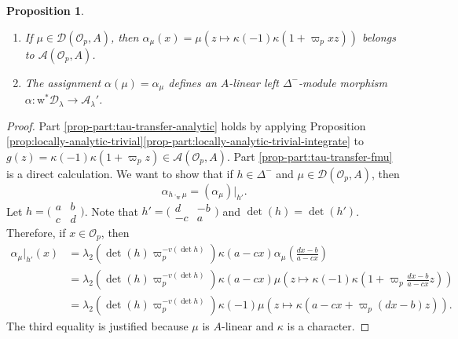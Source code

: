 \documentclass[10pt, twoside]{amsart}
\theoremstyle{plain}
\newtheorem{proposition}[theorem]{Proposition}
\theoremstyle{definition}
\theoremstyle{remark}
\numberwithin{equation}{subsection}
\def\scro{\mathscr O}
\def\scra{\mathscr A}
\def\scrd{\mathscr D}
\def\scro{\mathscr O}
\newcommand{\smallmat}[4]{\bigl(\begin{smallmatrix}#1&#2\\#3&#4\end{smallmatrix}\bigr)}
\begin{document}
\begin{proposition}\label{prop:tau-transfer}
\leavevmode
\begin{enumerate}[label=(\roman*)]
\item If $\mu \in \scrd(\scro_p,A)$, then $
\alpha_\mu(x) = \mu(z \mapsto \kappa(-1)\kappa(1 + \varpi_p xz))$ belongs to $\scra(\scro_p,A)$.\label{prop-part:tau-transfer-analytic}
\item The assignment $\alpha(\mu) = \alpha_\mu$ defines an $A$-linear left $\Delta^-$-module morphism $\alpha: { \boldsymbol{\mathrm{w}}}^{\ast}\scrd_\lambda \rightarrow \scra_\lambda'$.\label{prop-part:tau-transfer-fmu}
\end{enumerate}
\end{proposition}
\begin{proof}
Part \ref{prop-part:tau-transfer-analytic} holds by applying Proposition \ref{prop:locally-analytic-trivial}\ref{prop-part:locally-analytic-trivial-integrate} to $g(z) = \kappa(-1)\kappa(1+\varpi_pz) \in \scra(\scro_p,A)$. Part \ref{prop-part:tau-transfer-fmu} is a direct calculation. We want to show that if $h \in \Delta^-$ and $\mu \in \scrd(\scro_p,A)$, then 
\begin{equation}\label{eqn:tau-transfer-goal}
\alpha_{h\cdot_{ \boldsymbol{\mathrm{w}}} \mu} = (\alpha_\mu)|_{h'}.
\end{equation}
Let $h = \smallmat abcd$. Note that $h' = \smallmat d{-b}{-c}a$ and $\det(h) = \det(h')$. Therefore, if $x \in \scro_p$, then
\begin{align}\label{eqn:hfmu}
\alpha_\mu|_{h'}(x) &= \lambda_2(\det(h)\varpi_p^{-v(\det h)})\kappa(a-cx)\alpha_\mu\left(\frac{dx-b}{a-cx}\right)\\
&= \lambda_2(\det(h)\varpi_p^{-v(\det h)})\kappa(a-cx)\mu\left(z \mapsto \kappa(-1)\kappa\left(1 + \varpi_p \frac{dx-b}{a-cx} z\right)\right)\nonumber\\
&= \lambda_2(\det(h)\varpi_p^{-v(\det h)}) \kappa(-1)\mu\left(z \mapsto \kappa(a-cx + \varpi_p(dx-b)z)\right).\nonumber
\end{align}
The third equality is justified because $\mu$ is $A$-linear and $\kappa$ is a character.


\end{proof}
\end{document}
